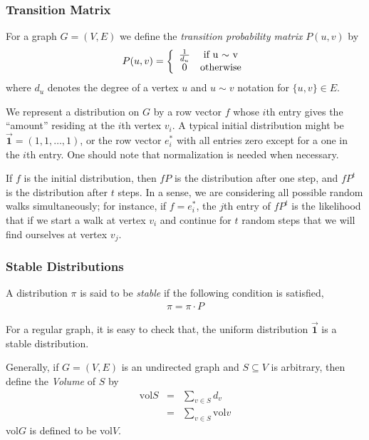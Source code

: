 \subsubsection{Transition Matrix}
For a graph $G=(V,E)$ we define the \emph{transition probability matrix} $P(u,v)$ by
\begin{eqnarray*}
P(u,v)=\left\{
\begin{array}{cc}
1\over d_u & \textrm{if u $\sim$ v}\\
0 & \textrm{otherwise}
\end{array}
\right.
\end{eqnarray*}
where $d_u$ denotes the degree of a vertex $u$ and $u\sim v$ notation for
$\{u,v\}\in E$.

We represent a distribution on $G$ by a row vector $f$ whose $i$th entry gives the
``amount'' residing at the $i$th vertex $v_i$. A typical initial distribution might
be $\overrightarrow{\mathbf{1}}=(1,1,\dots,1)$, or the row vector $e^*_i$ with all
entries zero except for a one in the $i$th entry. One should note that normalization
is needed when necessary.

If $f$ is the initial distribution, then $fP$ is the distribution after one step,
and $fP^t$ is the distribution after $t$ steps. In a sense, we are considering all
possible random walks simultaneously; for instance, if $f=e^*_i$, the $j$th entry of
$fP^t$ is the likelihood that if we start a walk at vertex $v_i$ and continue for
$t$ random steps that we will find ourselves at vertex $v_j$.

\subsubsection{Stable Distributions}
A distribution $\pi$ is said to be \emph{stable} if the following condition is
satisfied,
\begin{eqnarray*}
\pi = \pi \cdot P
\end{eqnarray*}

For a regular graph, it is easy to check that, the uniform distribution
$\overrightarrow{\mathbf{1}}$ is a stable distribution.

Generally, if $G=(V,E)$ is an undirected graph and $S\subseteq V$ is arbitrary, then
define the \emph{Volume} of $S$ by
\begin{eqnarray*}
\text{vol} S&=&\sum_{v\in S}d_v\\
&=&\sum_{v\in S}\text{vol} v
\end{eqnarray*}
vol$G$ is defined to be vol$V$.

